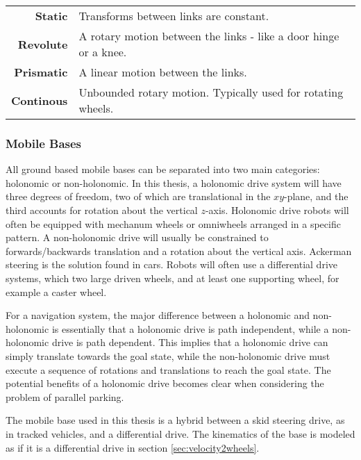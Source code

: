 \begin{center}
	\begin{tabular}{ r p{10cm} }
	\textbf{Static} & Transforms between links are constant.\\
	\textbf{Revolute} &  A rotary motion between the links - like a door hinge or a knee.\\
	\textbf{Prismatic} & A linear motion between the links. \\
	\textbf{Continous} & Unbounded rotary motion. Typically used for rotating wheels. \\
	\end{tabular}
\end{center}


\subsubsection{Mobile Bases}

All ground based mobile bases can be separated into two main categories: holonomic or non-holonomic. In this thesis, a holonomic drive system will have three degrees of freedom, two of which are translational in the $xy$-plane, and the third accounts for rotation about the vertical $z$-axis. Holonomic drive robots will often be equipped with mechanum wheels or omniwheels arranged in a specific pattern. A non-holonomic drive will usually be constrained to forwards/backwards translation and a rotation about the vertical axis. Ackerman steering is the solution found in cars. Robots will often use a differential drive systems, which two large driven wheels, and at least one supporting wheel, for example a caster wheel.

For a navigation system, the major difference between a holonomic and non-holonomic is essentially that a holonomic drive is path independent, while a non-holonomic drive is path dependent. This implies that a holonomic drive can simply translate towards the goal state, while the non-holonomic drive must execute a sequence of rotations and translations to reach the goal state. The potential benefits of a holonomic drive becomes clear when considering the problem of parallel parking.

The mobile base used in this thesis is a hybrid between a skid steering drive, as in tracked vehicles, and a differential drive. The kinematics of the base is modeled as if it is a differential drive in section \ref{sec:velocity2wheels}.

